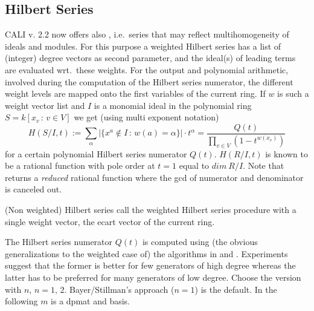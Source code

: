 \subsection{Hilbert Series}

CALI v. 2.2 now offers also , i.e.\
series that may reflect multihomogeneity of ideals and modules. For
this purpose
a weighted Hilbert series has a list of (integer) degree vectors
as second parameter, and the ideal(s) of leading terms are evaluated
wrt.\ these weights. For the output and polynomial arithmetic,
involved during the computation of the Hilbert series numerator, the
different weight levels are mapped onto the first variables of the
current ring. If $w$ is such a weight vector list and $I$ is a
monomial ideal in the polynomial ring $S=k[x_v\,:\,v\in V]$ we get
(using multi exponent notation)
\[H(S/I,t) := \sum_{\alpha}{|\{x^a\not\in I\,:\,w(a)=\alpha\}|\cdot
t^\alpha} = \frac{Q(t)}{\prod_{v\in V}{\left(1-t^{w(x_v)}\right)} }\]
for a certain polynomial Hilbert series numerator $Q(t)$. $H(R/I,t)$
is known to be a rational function with pole order at $t=1$ equal to
$dim\ R/I$. Note that \ind{WeightedHilbertSeries} returns a {\em
reduced} rational function where the gcd of numerator and denominator
is canceled out.

(Non weighted) Hilbert series call the weighted Hilbert series
procedure with a single weight vector, the ecart vector of the current
ring.

The Hilbert series numerator $Q(t)$ is computed using (the obvious
generalizations to the weighted case of) the algorithms in \cite{BS}
and \cite{BCRT}. Experiments suggest that the former is better for few
generators of high degree whereas the latter has to be preferred for
many generators of low degree. Choose the version with
 $n$, $n=1,\,2$. Bayer/Stillman's approach ($n=1$)
is the default. In the following $m$ is a dpmat and \gr basis.

